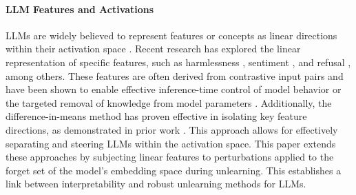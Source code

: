 \paragraph{LLM Features and Activations}
LLMs are widely believed to represent features or concepts as linear directions within their activation space \cite{mikolov2013linguistic, elhage2022toy, park2023linear}. Recent research has explored the linear representation of specific features, such as harmlessness \cite{wolf2024tradeoffs, zheng2024prompt}, sentiment \cite{tigges2023linear}, and refusal \cite{single_direction}, among others. These features are often derived from contrastive input pairs \cite{panickssery2023steering} and have been shown to enable effective inference-time control of model behavior \cite{hernandez2023inspecting, stickland2024steering} or the targeted removal of knowledge from model parameters \cite{ravfogel2020null}. 
Additionally, the difference-in-means method has proven effective in isolating key feature directions, as demonstrated in prior work \cite{marks2023geometry, stickland2024steering}. This approach allows for effectively separating and steering LLMs within the activation space.
This paper extends these approaches by subjecting linear features to perturbations applied to the forget set of the model’s embedding space during unlearning. This establishes a link between interpretability and robust unlearning methods for LLMs.










